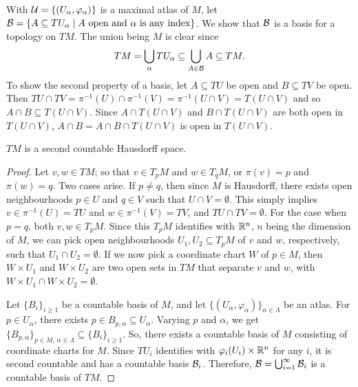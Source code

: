 With $\mathcal{U} = \{(U_{\alpha},\varphi_{\alpha})\}$ is a maximal atlas of $M$, let $\mathcal{B} = \{A \subseteq TU_{\alpha} \mid A \text{ open and } \alpha \text{ is any index}\}$. We show that $\mathcal{B}$ is a basis for a topology on $TM$. The union being $M$ is clear since
\begin{align}
    TM = \bigcup_{\alpha} TU_{\alpha} \subseteq \bigcup_{A \in \mathcal{B}} A \subseteq TM.
\end{align}
To show the second property of a basis, let $A \subseteq TU$ be open and $B \subseteq TV$ be open. Then $TU \cap TV = \pi^{-1}(U) \cap \pi^{-1}(V) = \pi^{-1}(U \cap V) = T(U \cap V)$ and so $A \cap B \subseteq T(U \cap V)$. Since $A \cap T(U \cap V)$ and $B \cap T(U \cap V)$ are both open in $T(U \cap V)$, $A \cap B = A \cap B \cap T(U \cap V)$ is open in $T(U \cap V)$.

\begin{lemma}
    $TM$ is a second countable Hausdorff space.
\end{lemma}
\begin{proof}
    Let $v,w \in TM$; so that $v \in T_{p}M$ and $w \in T_{q}M$, or $\pi(v) = p$ and $\pi(w) = q$. Two cases arise. If $p \neq q$, then since $M$ is Hausdorff, there exists open neighbourhoods $p \in U$ and $q \in V$ such that $U \cap V = \emptyset$. This simply implies $v \in \pi^{-1}(U) = TU$ and $w \in \pi^{-1}(V) = TV$, and $TU \cap TV = \emptyset$. For the case when $p = q$, both $v,w \in T_{p}M$. Since this $T_{p}M$ identifies with $\mathbb{R}^{n}$, $n$ being the dimension of $M$, we can pick open neighbourhoods $U_{1},U_{2} \subseteq T_{p}M$ of $v$ and $w$, respectively, such that $U_{1} \cap U_{2} = \emptyset$. If we now pick a coordinate chart $W$ of $p \in M$, then $W \times U_{1}$ and $W \times U_{2}$ are two open sets in $TM$ that separate $v$ and $w$, with $W \times U_{1} \cap W \times U_{2} = \emptyset$.

    Let $\{B_{i}\}_{i \geq 1}$ be a countable basis of $M$, and let $\{(U_{\alpha},\varphi_{\alpha})\}_{\alpha \in \Lambda}$ be an atlas. For $p \in U_{\alpha}$, there exists $p \in B_{p,\alpha} \subseteq U_{\alpha}$. Varying $p$ and $\alpha$, we get $\{B_{p,\alpha}\}_{p \in M, \, \alpha \in \Lambda} \subseteq \{B_{i}\}_{i \geq 1}$. So, there exists a countable basis of $M$ consisting of coordinate charts for $M$. Since $TU_{i}$ identifies with $\varphi_{i}(U_{i}) \times \mathbb{R}^{n}$ for any $i$, it is second countable and has a countable basis $\mathcal{B}_{i}$. Therefore, $\mathcal{B} = \bigcup_{i=1}^{\infty} \mathcal{B}_{i}$ is a countable basis of $TM$.
\end{proof}

